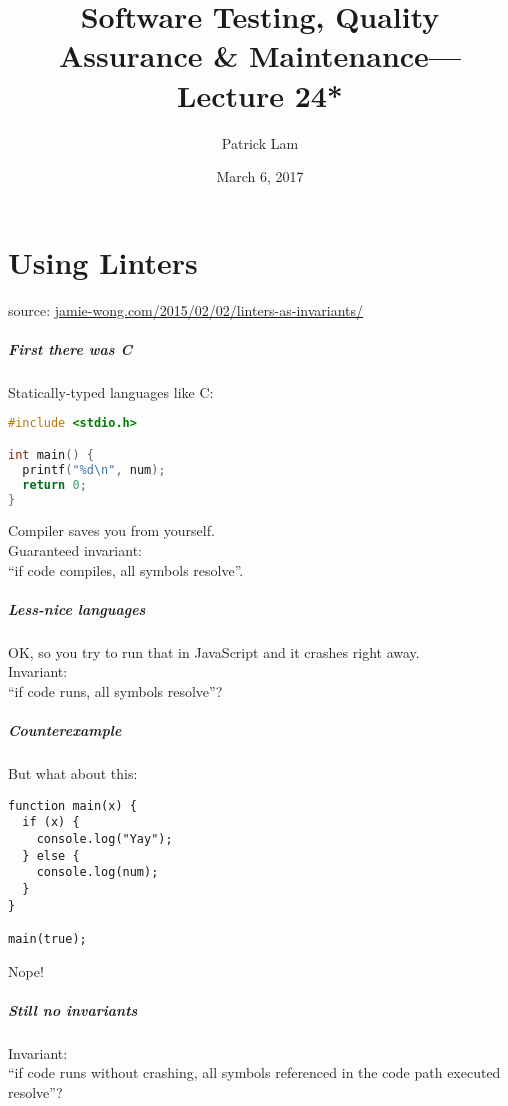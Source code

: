 \documentclass{beamer}
\title{Software Testing, Quality Assurance \& Maintenance---Lecture 24*}
\author{Patrick Lam}
\date{March 6, 2017}
\newenvironment{changemargin}[1]{%
  \begin{list}{}{%
    \setlength{\topsep}{0pt}%
    \setlength{\leftmargin}{#1}%
    \setlength{\rightmargin}{1em}
    \setlength{\listparindent}{\parindent}%
    \setlength{\itemindent}{\parindent}%
    \setlength{\parsep}{\parskip}%
  }%
  \item[]}{\end{list}}
\begin{document}
\begin{frame}
  \titlepage
\end{frame}

\part{Using Linters}

\begin{frame}
\partpage
\small
source: \url{jamie-wong.com/2015/02/02/linters-as-invariants/}
\end{frame}

\begin{frame}[fragile]
\frametitle{First there was C}
\begin{changemargin}{2cm}
Statically-typed languages like C:
\begin{lstlisting}[language=C]
#include <stdio.h>

int main() {
  printf("%d\n", num);
  return 0;
}
\end{lstlisting}
Compiler saves you from yourself.\\[1em]
Guaranteed invariant:\\
\hspace*{2em} ``if code compiles, all symbols resolve''.
\end{changemargin}
\end{frame}

\begin{frame}[fragile]
\frametitle{Less-nice languages}
\begin{changemargin}{2cm}
OK, so you try to run that in JavaScript and it crashes right away.\\[1em]

Invariant:\\
\hspace*{2em} ``if code runs, all symbols resolve''?
\end{changemargin}
\end{frame}

\begin{frame}[fragile]
\frametitle{Counterexample}
\begin{changemargin}{2cm}
But what about this:
\begin{lstlisting}
function main(x) {
  if (x) {
    console.log("Yay");
  } else {
    console.log(num);
  }
}

main(true);
\end{lstlisting}
Nope!
\end{changemargin}
\end{frame}
\begin{frame}[fragile]
\frametitle{Still no invariants}
\begin{changemargin}{2cm}
Invariant:\\
\hspace*{2em} ``if code runs without crashing, all symbols referenced in the code path executed resolve''?
\end{changemargin}
\end{frame}
\end{document}
